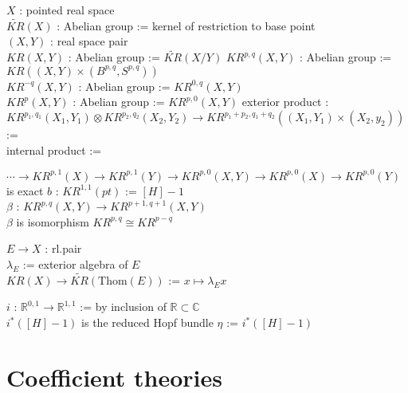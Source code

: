 \documentclass[dvipdfmx]{jsarticle}
\begin{document}
\begin{Definition}
\itemdefi
  \For \(X\) : pointed real space \\
  \Define \(\widetilde{KR}(X)\) : Abelian group := kernel of restriction to base point \\
\itemdefi
  \For \((X,Y)\) : real space pair \\
  \Define \(KR(X,Y)\) : Abelian group := \(\widetilde{KR}(X/Y)\)
\itemdefi
  \Define \(KR^{p,q}(X,Y)\) : Abelian group := \(KR((X,Y) \times (B^{p,q}, S^{p,q}))\) \\
  \Define \(KR^{-q}(X,Y)\) : Abelian group := \(KR^{0,q}(X,Y)\) \\
  \Define \(KR^{p}(X,Y)\) : Abelian group := \(KR^{p,0}(X,Y)\)
\itemdefi
  \Define exterior product : \(KR^{p_1,q_1}(X_1,Y_1) \otimes KR^{p_2,q_2}(X_2,Y_2) \to KR^{p_1+p_2, q_1+q_2}((X_1,Y_1) \times (X_2,y_2))\) :=  \\
  \Define internal product := 
\end{Definition}

\begin{Theorem}
\itemprop
  \Then \(\cdots \to KR^{p,1}(X) \to KR^{p,1}(Y) \to KR^{p,0}(X,Y) \to KR^{p,0}(X) \to KR^{p,0}(Y)\) is exact
\itemprop
  \Let \(b\) : \(KR^{1,1}(pt)\) := \([H] - 1\) \\
  \Define \(\beta\) : \(KR^{p,q}(X,Y) \to KR^{p+1,q+1}(X,Y)\) \\
  \Then \(\beta\) is isomorphism
\itemprop
  \Then \(KR^{p,q} \cong KR^{p-q}\)
\end{Theorem}

\begin{Theorem}
\itemprop
  \For \(E \to X\) : rl.pair \\
  \Let \(\lambda_E\) := exterior algebra of \(E\) \\
  \Then \(KR(X) \to \widetilde{KR}(\text{Thom}(E))\) := \(x \mapsto \lambda_E x\)
\end{Theorem}

\begin{Theorem}
\itemprop
  \Let \(i\) : \(\mathbb{R}^{0,1} \to \mathbb{R}^{1,1}\) := by inclusion of \(\mathbb{R} \subset \mathbb{C}\) \\
  \Then \(i^*([H] - 1)\) is the reduced Hopf bundle
\itemdefi
  \Define \(\eta\) := \(i^*([H] - 1)\)
\end{Theorem}

\section*{Coefficient theories}
\end{document}
